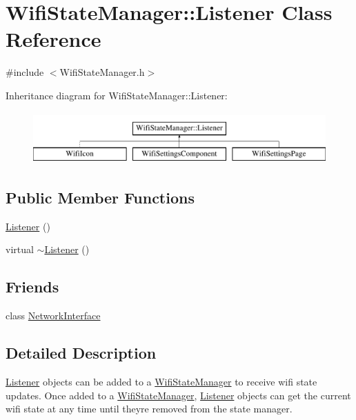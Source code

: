 \hypertarget{classWifiStateManager_1_1Listener}{}\section{Wifi\+State\+Manager\+:\+:Listener Class Reference}
\label{classWifiStateManager_1_1Listener}


{\ttfamily \#include $<$Wifi\+State\+Manager.\+h$>$}

Inheritance diagram for Wifi\+State\+Manager\+:\+:Listener\+:\begin{figure}[H]
\begin{center}
\leavevmode
\includegraphics[height=2.000000cm]{classWifiStateManager_1_1Listener}
\end{center}
\end{figure}
\subsection*{Public Member Functions}
\begin{DoxyCompactItemize}
\item 
\mbox{\hyperlink{classWifiStateManager_1_1Listener_a1e6da29497d8572438f7d84746556f63}{Listener}} ()
\item 
virtual \mbox{\hyperlink{classWifiStateManager_1_1Listener_a31a5ed32f598b0701d9ccbfe71aba0ab}{$\sim$\+Listener}} ()
\end{DoxyCompactItemize}
\subsection*{Friends}
\begin{DoxyCompactItemize}
\item 
class \mbox{\hyperlink{classWifiStateManager_1_1Listener_ab35230e6cee8f196334bff4237ada67c}{Network\+Interface}}
\end{DoxyCompactItemize}


\subsection{Detailed Description}
\mbox{\hyperlink{classWifiStateManager_1_1Listener}{Listener}} objects can be added to a \mbox{\hyperlink{classWifiStateManager}{Wifi\+State\+Manager}} to receive wifi state updates. Once added to a \mbox{\hyperlink{classWifiStateManager}{Wifi\+State\+Manager}}, \mbox{\hyperlink{classWifiStateManager_1_1Listener}{Listener}} objects can get the current wifi state at any time until they\textquotesingle{}re removed from the state manager. 

